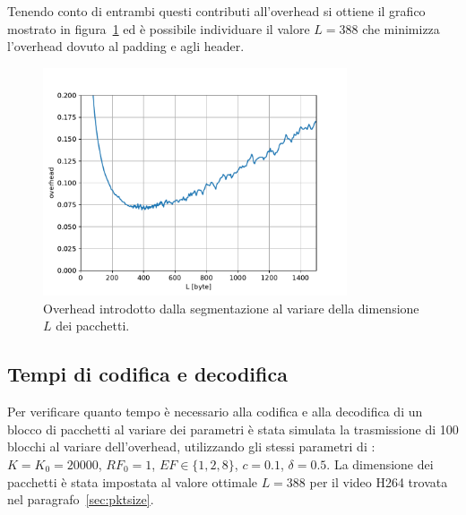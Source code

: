 \documentclass[italian, a4paper, 12pt]{article}
\begin{document}
Tenendo conto di entrambi questi contributi all'overhead si ottiene il
grafico mostrato in figura~\ref{fig:pktsize} ed è possibile
individuare il valore $L = 388$ che minimizza l'overhead dovuto al
padding e agli header.
\begin{figure}[H]
  \centering
  \includegraphics[width=0.8\textwidth]{plot_overhead}
  \caption{Overhead introdotto dalla segmentazione al variare della
    dimensione $L$ dei pacchetti.}
  \label{fig:pktsize}
\end{figure}

\subsection{Tempi di codifica e decodifica}
Per verificare quanto tempo è necessario alla codifica e alla
decodifica di un blocco di pacchetti al variare dei parametri è stata
simulata la trasmissione di 100 blocchi al variare dell'overhead,
utilizzando gli stessi parametri di \cite{uep}: $K = K_0 = 20000$,
$RF_0 = 1$, $EF \in \{1,2,8\}$, $c=0.1$, $\delta=0.5$.
%
La dimensione dei pacchetti è stata impostata al valore ottimale
$L=388$ per il video H264 trovata nel paragrafo~\ref{sec:pktsize}.
\end{document}
